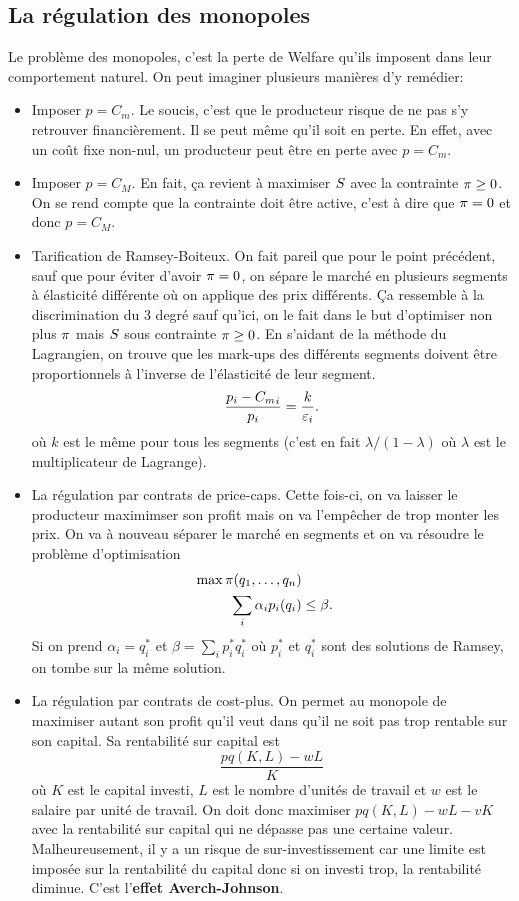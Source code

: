 \subsection{La régulation des monopoles}
Le problème des monopoles, c'est la perte de Welfare qu'ils imposent
dans leur comportement naturel.
On peut imaginer plusieurs manières d'y remédier:
\begin{itemize}
  \item Imposer $p = C_m$.
    Le soucis, c'est que le producteur risque de ne pas s'y retrouver
    financièrement. Il se peut même qu'il soit en perte.
    En effet, avec un coût fixe non-nul, un producteur peut être en perte
    avec $p = C_m$.
  \item Imposer $p = C_M$.
    En fait, ça revient à maximiser $S$ avec la contrainte
    $\pi \geq 0$.
    On se rend compte que la contrainte doit être active, c'est à dire que
    $\pi = 0$ et donc $p = C_M$.
  \item Tarification de Ramsey-Boiteux.
    On fait pareil que pour le point précédent, sauf que pour éviter
    d'avoir $\pi = 0$,
    on sépare le marché en plusieurs segments à élasticité différente
    où on applique des prix différents.
    Ça ressemble à la discrimination du 3\ieme{} degré sauf qu'ici,
    on le fait dans le but d'optimiser non plus $\pi$ mais $S$
    sous contrainte $\pi \geq 0$.
    En s'aidant de la méthode du Lagrangien, on trouve que les
    mark-ups des différents segments doivent être proportionnels à l'inverse
    de l'élasticité de leur segment.
    \[ \frac{p_i - {C_m}_i}{p_i} = \frac{k}{\varepsilon_i}. \]
    où $k$ est le même pour tous les segments (c'est en fait
    $\lambda/(1-\lambda)$ où $\lambda$ est le multiplicateur de Lagrange).
  \item La régulation par contrats de price-caps.
    Cette fois-ci, on va laisser le producteur maximimser son profit
    mais on va l'empêcher de trop monter les prix.
    On va à nouveau séparer le marché en segments et on va résoudre
    le problème d'optimisation
    \begin{align*}
      \max \pi(q_1,\ldots,q_n)\\
      \sum_i \alpha_ip_i(q_i) & \leq \beta.
    \end{align*}
    Si on prend $\alpha_i = q_i^*$ et $\beta = \sum_i p_i^*q_i^*$
    où $p_i^*$ et $q_i^*$ sont des solutions de Ramsey, on tombe
    sur la même solution.
  \item La régulation par contrats de cost-plus.
    On permet au monopole de maximiser autant son profit qu'il veut
    dans qu'il ne soit pas trop rentable sur son capital.
    Sa rentabilité sur capital est
    \[ \frac{pq(K, L) - wL}{K} \]
    où $K$ est le capital investi, $L$ est le nombre d'unités de travail
    et $w$ est le salaire par unité de travail.
    On doit donc maximiser $pq(K,L) - wL - vK$ avec la rentabilité sur capital
    qui ne dépasse pas une certaine valeur.
    Malheureusement, il y a un risque de sur-investissement car
    une limite est imposée sur la rentabilité du capital donc si on investi
    trop, la rentabilité diminue.
    C'est l'\textbf{effet Averch-Johnson}.
\end{itemize}

